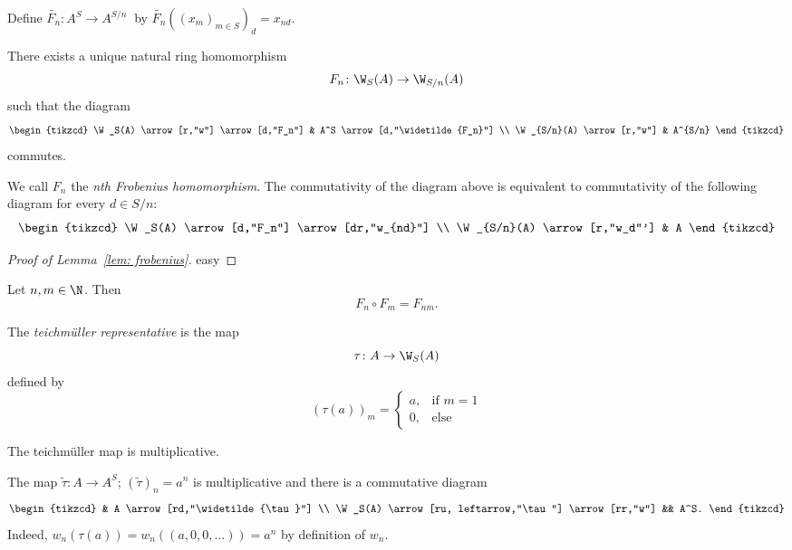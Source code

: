 Define $\widetilde{F_n} \colon A^S \to A^{S/n} \ $
by $\widetilde{F_n}((x_m)_{m \in S})_d = x_{nd}$.
\begin{lemma} \label{lem: frobenius}
    There exists a unique natural ring homomorphism
    \[
      F_n \colon \W_S(A) \to \W_{S/n}(A)  
    \]
    such that the diagram 
    \[
        \begin{tikzcd}
            \W_S(A) \arrow[r,"w"] \arrow[d,"F_n"] 
              & A^S \arrow[d,"\widetilde{F_n}"] \\
            \W_{S/n}(A) \arrow[r,"w"]
              & A^{S/n}
        \end{tikzcd}        
    \]
    commutes.
\end{lemma}

    We call $F_n$ the \textit{nth Frobenius homomorphism}.
    The commutativity of the diagram above is equivalent to
    commutativity of the following diagram for every $d \in S/n$:
    \[
        \begin{tikzcd}
            \W_S(A) \arrow[d,"F_n"] \arrow[dr,"w_{nd}"] \\
            \W_{S/n}(A) \arrow[r,"w_d"'] 
            & A
        \end{tikzcd}
    \]

\begin{proof}[Proof of Lemma~\ref*{lem: frobenius}]
    easy
\end{proof}
\begin{lemma} \label{lem: F_n after F_m is F_{nm}}
    Let $n,m \in \N$.
    Then 
    \[F_n \circ F_m = F_{nm}.\]
\end{lemma}
\begin{beweis}
    \todo{}
\end{beweis}
\begin{definition}
    The \textit{teichmüller representative} is the map
    \[
      \tau \colon A \to \W_S(A)  
    \]
    defined by
    \[
      (\tau(a))_m =   
      \begin{cases}
        a, & \text{if } m = 1\\
        0, & \text{else}
        \end{cases}
    \]
\end{definition}
\begin{lemma} \label{lem: teichmüller is multiplicative}
    The teichmüller map is multiplicative.
\end{lemma}
\begin{beweis}
    The map $\widetilde{\tau} \colon A \to A^S$; $(\widetilde{\tau})_n = a^n$
    is multiplicative and there is a commutative diagram
    \[
        \begin{tikzcd}
              & A \arrow[rd,"\widetilde{\tau}"] \\ %
            \W_S(A) \arrow[ru, leftarrow,"\tau"] \arrow[rr,"w"]
                && A^S.
        \end{tikzcd}
    \]
    Indeed, $w_n(\tau(a)) = w_n((a,0,0,\dots)) = a^n$
    by definition of $w_n$.

\end{beweis}
